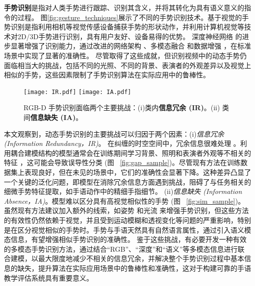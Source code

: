 \textbf{手势识别}是指对人类手势进行跟踪、识别其含义，并将其转化为具有语义意义的指令的过程\cite{rautaray2015vision}。
图\ref{fig:gesture_techniques}展示了不同的手势识别技术。基于视觉的手势识别是指利用相机等视觉传感设备捕获手势的形状动作，并利用计算机视觉等技术对2D/3D手势进行识别，具有用户友好、设备易得的优势。
深度神经网络 \cite{zhou2023unified,li2021trear} 的进步显著增强了识别能力，通过改进的网络架构 \cite{zhu2019redundancy,zhu2018continuous,zhou2022decoupling}、多模态融合 \cite{li2021trear,narayana2018focus,yu2021searching} 和数据增强 \cite{li2021trear,zuo2023natural}，在标准场景中实现了显著的准确性。
尽管取得了这些成就，但识别视频中的动态手势仍面临相当大的挑战，包括不同的光照、不同的背景、表演者的外观差异以及视觉上相似的手势，这些因素限制了手势识别算法在实际应用中的鲁棒性。

\begin{figure}[tb]
  \centering
  {\texttt{[image: IR.pdf]}}
  {\texttt{[image: IA.pdf]}}
  \caption{RGB-D 手势识别面临两个主要挑战：(i)类内\textbf{信息冗余 (IR)}。(ii) 类间\textbf{信息缺失 (IA)}。}
  \label{fig:samples}
  \end{figure}

本文观察到，动态手势识别的主要挑战可以归因于两个因素：(i)\textit{信息冗余 (Information Redundancy，IR)}。
在纠缠的时空空间中，冗余信息很难处理 \cite{zhou2023unified, LI2024110536}。利用耦合建模结构的模型通常会在训练期间学习背景、照明和表演者外观等不相关的特征 \cite{zhou2023unified}，这可能会导致误导性分类 (图 ~\ref{fig:gap_sample})。尽管现有方法在训练数据集上表现良好，但在未见的场景中，它们的准确性会显著下降。这种差异凸显了一个关键的泛化问题，即模型在消除冗余信息方面遇到挑战，阻碍了与任务相关的细微手势特征提取，如手语动作中的精细手指细节。
(ii)\textit{信息缺失 (Information Absence，IA)}。模型难以区分具有高视觉相似性的手势 (图 ~\ref{fig:sim_sample})。虽然现有方法建议加入额外的线索，如姿势 \cite{wan2016chalearn,zuo2023natural} 和光流 \cite{narayana2018focus} 来增强手势识别，但这些方法的有效性仍然依赖于视觉，并且受到运动模糊和透视变化等问题的严重影响，特别是在区分视觉相似的手势时。手势与手语天然具有自然语言属性，通过引入语义模态信息，有望增强相似手势识别的准确性。
鉴于这些挑战，有必要开发一种有效的多模态手势识别方法，通过结合“RGB”、“深度”和“语义”等多模态信息进行联合建模，以最大限度地减少不相关的信息冗余，并解决整个手势识别过程中基本信息的缺失，提升算法在实际应用场景中的鲁棒性和准确性，这对于构建可靠的手语教学评估系统具有重要意义。

